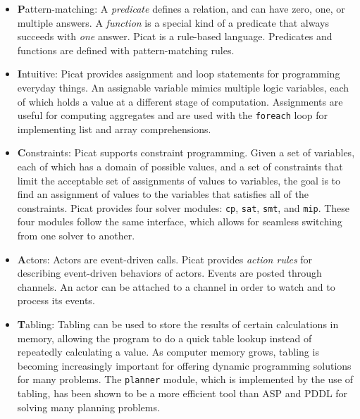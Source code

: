 \begin{itemize}
\item \textbf{P}attern-matching: A \emph{predicate} defines a relation, and can have zero, one, or multiple answers. A \emph{function} is a special kind of a predicate that always succeeds with \emph{one} answer. Picat is a rule-based language. Predicates and functions are defined with pattern-matching rules.

\item \textbf{I}ntuitive: Picat provides assignment and loop statements for programming everyday things. An assignable variable mimics multiple logic variables, each of which holds a value at a different stage of computation. Assignments are useful for computing aggregates and are used with the {\tt foreach} loop for implementing list and array comprehensions.

\item \textbf{C}onstraints: Picat supports constraint programming.  Given a set of variables, each of which has a domain of possible values, and a set of constraints that limit the acceptable set of assignments of values to variables, the goal is to find an assignment of values to the variables that satisfies all of the constraints. Picat provides four solver modules: {\tt cp}, {\tt sat}, {\tt smt}, and {\tt mip}. These four modules follow the same interface, which allows for seamless switching from one solver to another.

\item \textbf{A}ctors: Actors are event-driven calls.  Picat provides \emph{action rules} for describing event-driven behaviors of actors. Events are posted through channels. An actor can be attached to a channel in order to watch and to process its events.

\item \textbf{T}abling: Tabling can be used to store the results of certain calculations in memory, allowing the program to do a quick table lookup instead of repeatedly calculating a value. As computer memory grows, tabling is becoming increasingly important for offering dynamic programming solutions for many problems. The \texttt{planner} module, which is implemented by the use of tabling, has been shown to be a more efficient tool than ASP and PDDL for solving many planning problems.

\end{itemize}

